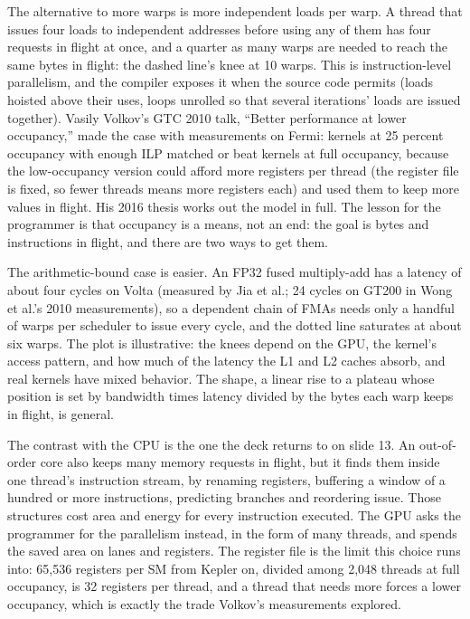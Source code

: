 \documentclass[11pt,letterpaper]{article}
\begin{document}
The alternative to more warps is more independent loads per warp. A thread that issues four loads to independent addresses before using any of them has four requests in flight at once, and a quarter as many warps are needed to reach the same bytes in flight: the dashed line's knee at 10 warps. This is instruction-level parallelism, and the compiler exposes it when the source code permits (loads hoisted above their uses, loops unrolled so that several iterations' loads are issued together). Vasily Volkov's GTC 2010 talk, ``Better performance at lower occupancy,'' made the case with measurements on Fermi: kernels at 25 percent occupancy with enough ILP matched or beat kernels at full occupancy, because the low-occupancy version could afford more registers per thread (the register file is fixed, so fewer threads means more registers each) and used them to keep more values in flight. His 2016 thesis works out the model in full. The lesson for the programmer is that occupancy is a means, not an end: the goal is bytes and instructions in flight, and there are two ways to get them.

The arithmetic-bound case is easier. An FP32 fused multiply-add has a latency of about four cycles on Volta (measured by Jia et al.; 24 cycles on GT200 in Wong et al.'s 2010 measurements), so a dependent chain of FMAs needs only a handful of warps per scheduler to issue every cycle, and the dotted line saturates at about six warps. The plot is illustrative: the knees depend on the GPU, the kernel's access pattern, and how much of the latency the L1 and L2 caches absorb, and real kernels have mixed behavior. The shape, a linear rise to a plateau whose position is set by bandwidth times latency divided by the bytes each warp keeps in flight, is general.

The contrast with the CPU is the one the deck returns to on slide 13. An out-of-order core also keeps many memory requests in flight, but it finds them inside one thread's instruction stream, by renaming registers, buffering a window of a hundred or more instructions, predicting branches and reordering issue. Those structures cost area and energy for every instruction executed. The GPU asks the programmer for the parallelism instead, in the form of many threads, and spends the saved area on lanes and registers. The register file is the limit this choice runs into: 65,536 registers per SM from Kepler on, divided among 2,048 threads at full occupancy, is 32 registers per thread, and a thread that needs more forces a lower occupancy, which is exactly the trade Volkov's measurements explored.
\end{document}
